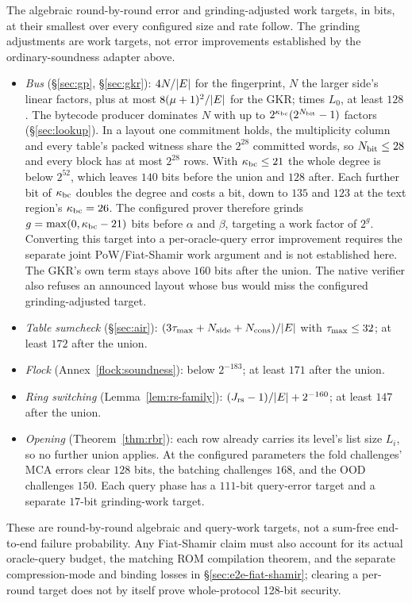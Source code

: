 The algebraic round-by-round error and grinding-adjusted work targets, in bits, at their smallest over every configured size and rate follow. The grinding adjustments are work targets, not error improvements established by the ordinary-soundness adapter above.
\begin{itemize}[itemsep=1pt,topsep=3pt]
\item \emph{Bus} (\S\ref{sec:gp}, \S\ref{sec:gkr}): $4N/|E|$ for the fingerprint, $N$ the larger side's linear factors, plus at most $8(\mu+1)^2/|E|$ for the GKR; times $L_0$, at least $128$. The bytecode producer dominates $N$ with up to $2^{\kappa_{\mathrm{bc}}}(2^{N_{\mathrm{bit}}}-1)$ factors (\S\ref{sec:lookup}). In a layout one commitment holds, the multiplicity column and every table's packed witness share the $2^{28}$ committed words, so $N_{\mathrm{bit}}\le28$ and every block has at most $2^{28}$ rows. With $\kappa_{\mathrm{bc}}\le21$ the whole degree is below $2^{52}$, which leaves $140$ bits before the union and $128$ after. Each further bit of $\kappa_{\mathrm{bc}}$ doubles the degree and costs a bit, down to $135$ and $123$ at the text region's $\kappa_{\mathrm{bc}}=26$. The configured prover therefore grinds $g=\max(0,\kappa_{\mathrm{bc}}-21)$ bits before $\alpha$ and $\beta$, targeting a work factor of $2^g$. Converting this target into a per-oracle-query error improvement requires the separate joint PoW/Fiat-Shamir work argument and is not established here. The GKR's own term stays above $160$ bits after the union. The native verifier also refuses an announced layout whose bus would miss the configured grinding-adjusted target.
\item \emph{Table sumcheck} (\S\ref{sec:air}): $(3\tau_{\max}+N_{\mathrm{side}}+N_{\mathrm{cons}})/|E|$ with $\tau_{\max}\le32$; at least $172$ after the union.
\item \emph{Flock} (Annex~\ref{flock:soundness}): below $2^{-183}$; at least $171$ after the union.
\item \emph{Ring switching} (Lemma~\ref{lem:rs-family}): $(J_{\mathrm{rs}}-1)/|E|+2^{-160}$; at least $147$ after the union.
\item \emph{Opening} (Theorem~\ref{thm:rbr}): each row already carries its level's list size $L_i$, so no further union applies. At the configured parameters the fold challenges' MCA errors clear $128$ bits, the batching challenges $168$, and the OOD challenges $150$. Each query phase has a $111$-bit query-error target and a separate $17$-bit grinding-work target.
\end{itemize}
These are round-by-round algebraic and query-work targets, not a sum-free end-to-end failure probability. Any Fiat-Shamir claim must also account for its actual oracle-query budget, the matching ROM compilation theorem, and the separate compression-mode and binding losses in \S\ref{sec:e2e-fiat-shamir}; clearing a per-round target does not by itself prove whole-protocol 128-bit security.
